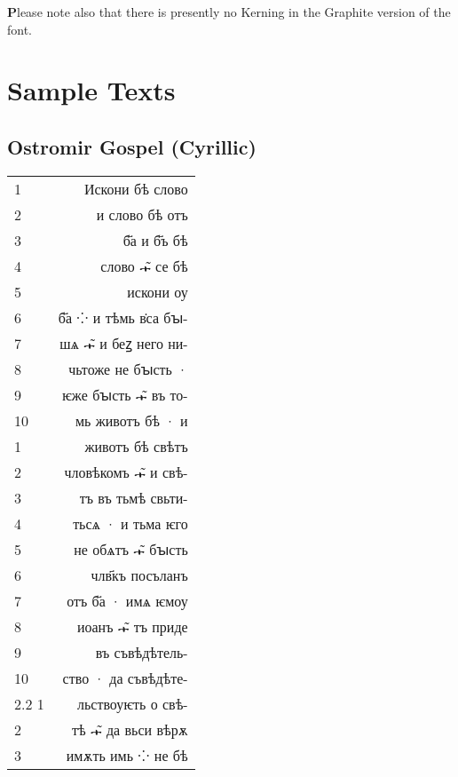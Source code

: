 {\textbf Please note also} that there is presently no Kerning in the Graphite version of the font. 

\section{Sample Texts}

\subsection{Ostromir Gospel (Cyrillic)}
\begin{tabular}{lr}
 1& {\Large \glyphfont    Искони бѣ слово } \\
 2& {\Large \glyphfont    и слово бѣ отъ  } \\
 3& {\Large \glyphfont   б҃а и б҃ъ бѣ} \\ 
 4& {\Large \glyphfont    слово  𝀏̃  се бѣ} \\ 
 5& {\Large \glyphfont    искони оу} \\ 
 6& {\Large \glyphfont    б҃а  ⁘  и тѣмь в̇са бꙑ-} \\ 
 7& {\Large \glyphfont    шѧ  𝀏̃  и беꙁ него ни-} \\ 
 8& {\Large \glyphfont    чьтоже не бꙑсть  ·} \\ 
 9& {\Large \glyphfont   ѥже бꙑсть  𝀏̃  въ то-} \\ 
10& {\Large \glyphfont    мь животъ бѣ  ·  и} \\ 
 1& {\Large \glyphfont    животъ бѣ свѣтъ} \\ 
 2& {\Large \glyphfont    чловѣкомъ  𝀏̃  и свѣ-} \\ 
 3& {\Large \glyphfont    тъ въ тьмѣ свьти-} \\ 
 4& {\Large \glyphfont    тьсѧ  ·  и тьма ѥго} \\ 
 5& {\Large \glyphfont    не обѧтъ  𝀏̃  бꙑсть} \\ 
 6& {\Large \glyphfont    члв҃къ посъланъ} \\ 
 7& {\Large \glyphfont    отъ б҃а  ·  имѧ ѥмоу} \\ 
 8& {\Large \glyphfont    иоанъ  𝀏̃  тъ приде} \\ 
 9& {\Large \glyphfont    въ съвѣдѣтель-} \\ 
10& {\Large \glyphfont    ство  ·  да съвѣдѣте-} \\ 
2.2  1& {\Large \glyphfont    льствоуѥть о свѣ-} \\ 
 2& {\Large \glyphfont    тѣ  𝀏̃  да вьси вѣрѫ} \\ 
 3& {\Large \glyphfont    имѫть имь  ⁘  не бѣ} \\ 

\end{tabular}

